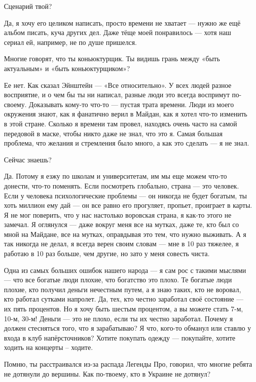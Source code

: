 Сценарий твой?

Да, я хочу его целиком написать, просто времени не хватает --- нужно же ещё
альбом писать, куча других дел. Даже тёще моей понравилось --- хотя наш сериал
ей, например, не по душе пришелся.

Многие говорят, что ты коньюктурщик. Ты видишь грань между «быть актуальным» и
«быть коньюктурщиком»?

Ее нет. Как сказал Эйнштейн --- «Все относительно». У всех людей разное
восприятие, и о чем бы ты ни написал, разные люди это всегда воспримут
по-своему. Доказывать кому-то что-то --- пустая трата времени. Люди из моего
окружения знают, как я фанатично верил в Майдан, как я хотел что-то изменить в
этой стране. Сколько я времени там провел, находясь очень часто на самой
передовой в маске, чтобы никто даже не знал, что это я. Самая большая проблема,
что желания и стремления было много, а как это сделать --- я не знал.

Сейчас знаешь?

Да. Потому я езжу по школам и университетам, им мы еще можем что-то донести,
что-то поменять. Если посмотреть глобально, страна --- это человек. Если у
человека психологические проблемы --- он никогда не будет богатым, ты хоть
миллион ему дай --- он все равно его прогуляет, пропьет, проиграет в карты. Я не
мог поверить, что у нас настолько воровская страна, я как-то этого не замечал.
Я оглянулся --- даже вокруг меня все на мутках, даже те, кто был со мной на
Майдане, все на мутках, оправдывая это тем, что нужно выживать. А я так никогда
не делал, я всегда верен своим словам --- мне в 10 раз тяжелее, я работаю в 10
раз больше, чем другие, но зато у меня совесть чиста. 

Одна из самых больших ошибок нашего народа --- я сам рос с такими мыслями --- что
все богатые люди плохие, что богатство это плохо. Те богатые люди плохие, кто
получил деньги нечестным путем, а я знаю таких, кто не воровал, кто работал
сутками напролет. Да, тех, кто честно заработал своё состояние --- их пять
процентов. Но я хочу быть шестым процентом, а вы можете стать 7-м, 10-м, 30-м!
Деньги --- это не плохо, если ты их честно заработал. Почему я должен стесняться
того, что я зарабатываю? Я что, кого-то обманул или ставлю у входа в клуб
напёрсточников? Хотите покупать одежду --- покупайте, хотите ходить на концерты –
ходите.

Помню, ты расстраивался из-за распада Легенды Про, говорил, что многие ребята
не дотянули до вершины. Как по-твоему, кто в Украине не дотянул?

